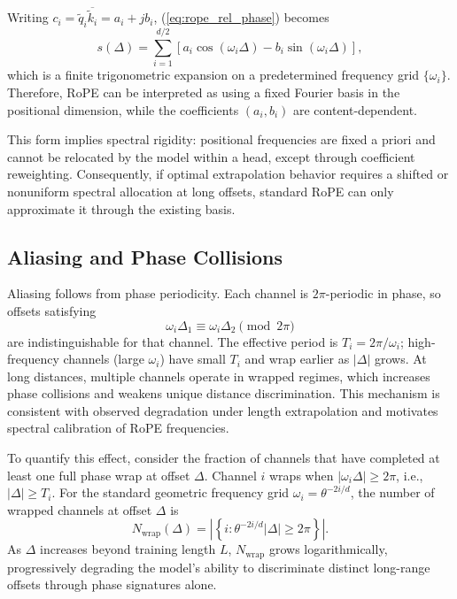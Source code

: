 \documentclass[conference]{IEEEtran}
\begin{document}
Writing $c_i=\tilde q_i\overline{\tilde k_i}=a_i+j b_i$, (\ref{eq:rope_rel_phase}) becomes
\begin{equation}
s(\Delta)=\sum_{i=1}^{d/2}\left[a_i\cos(\omega_i\Delta)-b_i\sin(\omega_i\Delta)\right],
\label{eq:fourier_sum}
\end{equation}
which is a finite trigonometric expansion on a predetermined frequency grid $\{\omega_i\}$. Therefore, RoPE can be interpreted as using a fixed Fourier basis in the positional dimension, while the coefficients $(a_i,b_i)$ are content-dependent.

This form implies spectral rigidity: positional frequencies are fixed a priori and cannot be relocated by the model within a head, except through coefficient reweighting. Consequently, if optimal extrapolation behavior requires a shifted or nonuniform spectral allocation at long offsets, standard RoPE can only approximate it through the existing basis.

\subsection{Aliasing and Phase Collisions}
Aliasing follows from phase periodicity. Each channel is $2\pi$-periodic in phase, so offsets satisfying
\begin{equation}
\omega_i \Delta_1 \equiv \omega_i \Delta_2 \pmod{2\pi}
\end{equation}
are indistinguishable for that channel. The effective period is $T_i=2\pi/\omega_i$; high-frequency channels (large $\omega_i$) have small $T_i$ and wrap earlier as $|\Delta|$ grows. At long distances, multiple channels operate in wrapped regimes, which increases phase collisions and weakens unique distance discrimination. This mechanism is consistent with observed degradation under length extrapolation and motivates spectral calibration of RoPE frequencies.

To quantify this effect, consider the fraction of channels that have completed at least one full phase wrap at offset $\Delta$. Channel $i$ wraps when $|\omega_i \Delta| \geq 2\pi$, i.e., $|\Delta| \geq T_i$. For the standard geometric frequency grid $\omega_i = \theta^{-2i/d}$, the number of wrapped channels at offset $\Delta$ is
\begin{equation}
N_{\text{wrap}}(\Delta) = \left|\left\{i : \theta^{-2i/d} |\Delta| \geq 2\pi \right\}\right|.
\end{equation}
As $\Delta$ increases beyond training length $L$, $N_{\text{wrap}}$ grows logarithmically, progressively degrading the model's ability to discriminate distinct long-range offsets through phase signatures alone.
\end{document}
